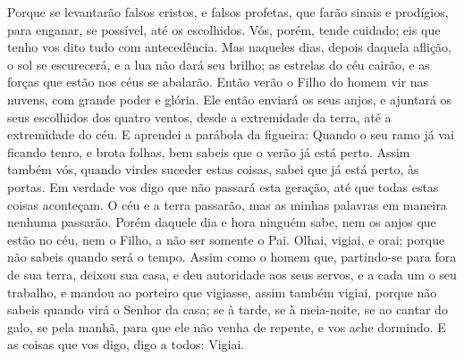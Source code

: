 {  Porque se levantarão falsos cristos, e falsos profetas, que farão sinais e prodígios, para enganar, se possível, até os escolhidos.
  Vós, porém, tende cuidado; eis que tenho vos dito tudo com antecedência.
  Mas naqueles dias, depois daquela aflição, o sol se escurecerá, e a lua não dará seu brilho;
  as estrelas do céu cairão, e as forças que estão nos céus se abalarão.
  Então verão o Filho do homem vir nas nuvens, com grande poder e glória.
  Ele então enviará os seus anjos, e ajuntará os seus escolhidos dos quatro ventos, desde a extremidade da terra, até a extremidade do céu.
  E aprendei a parábola da figueira: Quando o seu ramo já vai ficando tenro, e brota folhas, bem sabeis que o verão já está perto.
  Assim também vós, quando virdes suceder estas coisas, sabei que já está perto, às portas.
  Em verdade vos digo que não passará esta geração, até que todas estas coisas aconteçam.
  O céu e a terra passarão, mas as minhas palavras em maneira nenhuma passarão.
  Porém daquele dia e hora ninguém sabe, nem os anjos que estão no céu, nem o Filho, a não ser somente o Pai.
  Olhai, vigiai, e orai; porque não sabeis quando será o tempo.
  Assim como o homem que, partindo-se para fora de sua terra, deixou sua casa, e deu autoridade aos seus servos, e a cada um o seu trabalho, e mandou ao porteiro que vigiasse,
  assim também vigiai, porque não sabeis quando virá o Senhor da casa; se à tarde, se à meia-noite, se ao cantar do galo, se pela manhã,
  para que ele não venha de repente, e vos ache dormindo.
  E as coisas que vos digo, digo a todos: Vigiai.
\par }

